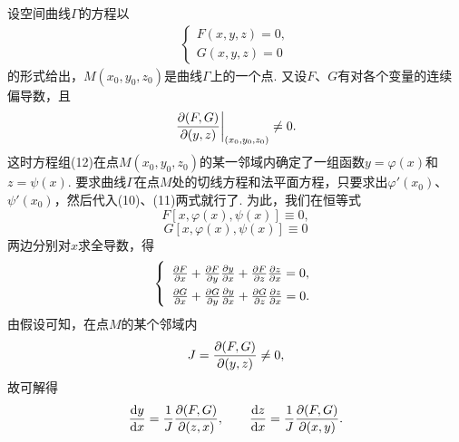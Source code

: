 设空间曲线\(\Gamma\)的方程以\begin{gather}
\left\{ \begin{array}{l}
F(x,y,z)=0, \\
G(x,y,z)=0
\end{array} \right.
\tag{12}
\end{gather}的形式给出，\(M(x_0,y_0,z_0)\)是曲线\(\Gamma\)上的一个点.
又设\(F\)、\(G\)有对各个变量的连续偏导数，且\[
\eval{\jacobi{F,G}{y,z}}_{(x_0,y_0,z_0)} \neq 0.
\]这时方程组(12)在点\(M(x_0,y_0,z_0)\)的某一邻域内确定了一组函数\(y=\varphi(x)\)和\(z=\psi(x)\).
要求曲线\(\Gamma\)在点\(M\)处的切线方程和法平面方程，只要求出\(\varphi'(x_0)\)、\(\psi'(x_0)\)，然后代入(10)、(11)两式就行了.
为此，我们在恒等式\[
F[x,\varphi(x),\psi(x)] \equiv 0,
\]\[
G[x,\varphi(x),\psi(x)] \equiv 0
\]两边分别对\(x\)求全导数，得\[
\def\arraystretch{1.5}
\left\{ \begin{array}{l}
\pdv{F}{x} + \pdv{F}{y} \pdv{y}{x} + \pdv{F}{z} \pdv{z}{x} = 0, \\
\pdv{G}{x} + \pdv{G}{y} \pdv{y}{x} + \pdv{G}{z} \pdv{z}{x} = 0.
\end{array} \right.
\]由假设可知，在点\(M\)的某个邻域内\[
J = \pdv{ (F,G) }{ (y,z) } \neq 0,
\]故可解得\[
\dv{y}{x} = \frac{1}{J} \pdv{ (F,G) }{ (z,x) },
\qquad
\dv{z}{x} = \frac{1}{J} \pdv{ (F,G) }{ (x,y) }.
\]


